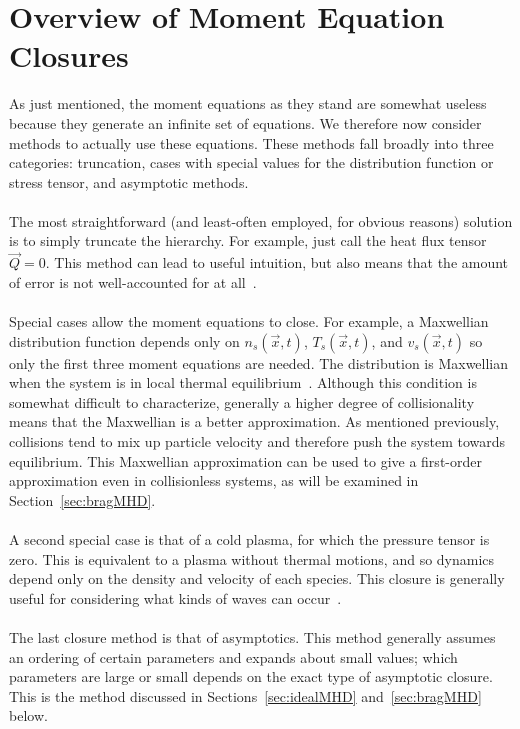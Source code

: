 \section{Overview of Moment Equation Closures} \label{sec:closures}
As just mentioned, the moment equations as they stand are somewhat useless because they generate an infinite set of equations. We therefore now consider methods to actually use these equations. These methods fall broadly into three categories: truncation, cases with special values for the distribution function or stress tensor, and asymptotic methods.\\
\\
The most straightforward (and least-often employed, for obvious reasons) solution is to simply truncate the hierarchy. For example, just call the heat flux tensor $\vec Q=0$. This method can lead to useful intuition, but also means that the amount of error is not well-accounted for at all~\cite{Hazeltine2004}.\\
\\
Special cases allow the moment equations to close. For example, a Maxwellian distribution function depends only on $n_s(\vec x,t)$, $T_s(\vec x,t)$, and $v_s(\vec x,t)$ so only the first three moment equations are needed. The distribution is Maxwellian when the system is in local thermal equilibrium~\cite{Hazeltine2004}. Although this condition is somewhat difficult to characterize, generally a higher degree of collisionality means that the Maxwellian is a better approximation. As mentioned previously, collisions tend to mix up particle velocity and therefore push the system towards equilibrium. This Maxwellian approximation can be used to give a first-order approximation even in collisionless systems, as will be examined in Section~\ref{sec:bragMHD}.\\
\\
A second special case is that of a cold plasma, for which the pressure tensor is zero. This is equivalent to a plasma without thermal motions, and so dynamics depend only on the density and velocity of each species. This closure is generally useful for considering what kinds of waves can occur~\cite{Hazeltine2004}.\\
\\
The last closure method is that of asymptotics. This method generally assumes an ordering of certain parameters and expands about small values; which parameters are large or small depends on the exact type of asymptotic closure. This is the method discussed in Sections~\ref{sec:idealMHD} and~\ref{sec:bragMHD} below.\\
